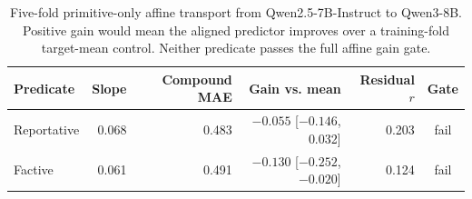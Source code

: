 \begin{table}[H]
\centering
\small
\begin{tabular}{lrrrrc}
\toprule
Predicate & Slope & Compound MAE & Gain vs. mean & Residual $r$ & Gate \\
\midrule
Reportative & 0.068 & 0.483 & $-0.055$ [$-0.146$, 0.032] & 0.203 & fail \\
Factive & 0.061 & 0.491 & $-0.130$ [$-0.252$, $-0.020$] & 0.124 & fail \\
\bottomrule
\end{tabular}
\caption{Five-fold primitive-only affine transport from Qwen2.5-7B-Instruct
to Qwen3-8B. Positive gain would mean the aligned predictor improves over a
training-fold target-mean control. Neither predicate passes the full affine
gain gate.}
\label{tab:affine-gain}
\end{table}
